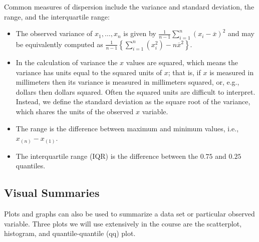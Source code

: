 \documentclass[
]{book}
\providecommand{\tightlist}{%
  \setlength{\itemsep}{0pt}\setlength{\parskip}{0pt}}
\theoremstyle{definition}
\theoremstyle{definition}
\theoremstyle{definition}
\theoremstyle{definition}
\theoremstyle{remark}
\begin{document}
Common measures of dispersion include the variance and standard deviation, the range, and the interquartile range:

\begin{itemize}
\tightlist
\item
  The observed variance of \(x_1, \ldots, x_n\) is given by \(\tfrac{1}{n-1}\sum_{i=1}^n(x_i - \overline x)^2\) and may be equivalently computed as \(\tfrac{1}{n-1}\left\{\sum_{i=1}^n (x_i^2) - n\overline x^2\right\}\).\\
\item
  In the calculation of variance the \(x\) values are squared, which means the variance has units equal to the squared units of \(x\); that is, if \(x\) is measured in millimeters then its variance is measured in millimeters squared, or, e.g., dollars then dollars squared. Often the squared units are difficult to interpret. Instead, we define the standard deviation as the square root of the variance, which shares the units of the observed \(x\) variable.\\
\item
  The range is the difference between maximum and minimum values, i.e., \(x_{(n)} - x_{(1)}\).
\item
  The interquartile range (IQR) is the difference between the \(0.75\) and \(0.25\) quantiles.
\end{itemize}

\hypertarget{visual-summaries}{%
\subsection{Visual Summaries}\label{visual-summaries}}

Plots and graphs can also be used to summarize a data set or particular observed variable. Three plots we will use extensively in the course are the scatterplot, histogram, and quantile-quantile (qq) plot.
\end{document}

